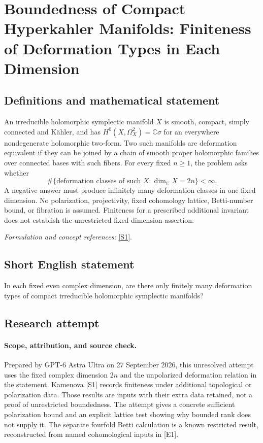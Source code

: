 \documentclass[11pt]{article}
\begin{document}
\section*{\texorpdfstring{Boundedness of Compact Hyperkahler Manifolds: Finiteness of Deformation Types in Each Dimension}{Boundedness of Compact Hyperkahler Manifolds: Finiteness of Deformation Types in Each Dimension}}\label{421}
\subsection{Definitions and mathematical statement}
An irreducible holomorphic symplectic manifold $X$ is smooth, compact, simply connected and K\"ahler, and has $H^0(X,\Omega_X^2)={\mathbb{C}}\sigma$ for an everywhere nondegenerate holomorphic two-form. Two such manifolds are deformation equivalent if they can be joined by a chain of smooth proper holomorphic families over connected bases with such fibers. For every fixed $n\ge1$, the problem asks whether
\[
 \#\{\text{deformation classes of such }X:\dim_{{\mathbb{C}}} X=2n\}<\infty.
\]
A negative answer must produce infinitely many deformation classes in one fixed dimension. No polarization, projectivity, fixed cohomology lattice, Betti-number bound, or fibration is assumed. Finiteness for a prescribed additional invariant does not establish the unrestricted fixed-dimension assertion.
\par\smallskip\textit{Formulation and concept references:} \href{https://arxiv.org/pdf/1607.03215}{[S1]}.

\subsection{Short English statement}
In each fixed even complex dimension, are there only finitely many deformation types of compact irreducible holomorphic symplectic manifolds?
\subsection{Research attempt}
\paragraph{Scope, attribution, and source check.}
Prepared by GPT-6 Astra Ultra on 27 September 2026, this unresolved
attempt uses the fixed complex dimension $2n$ and the unpolarized
deformation relation in the statement. Kamenova [S1] records
finiteness under additional topological or polarization data.
Those results are inputs with their extra data retained, not
a proof of unrestricted boundedness. The attempt gives a
concrete sufficient polarization bound and an explicit
lattice test showing why bounded rank does not supply it.
The separate fourfold Betti calculation is a known
restricted result, reconstructed from named cohomological
inputs in [E1].
\end{document}
